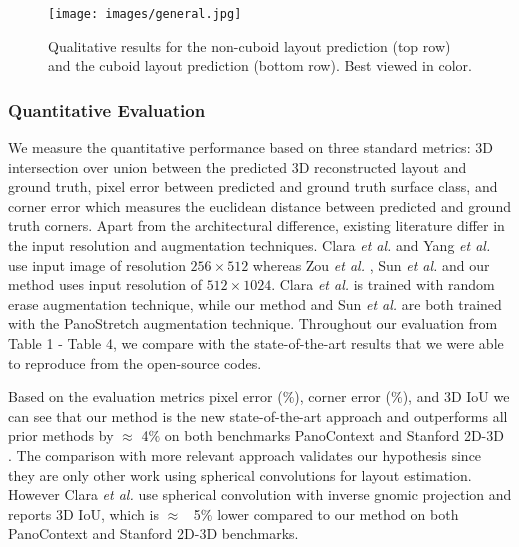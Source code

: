 \documentclass[final]{cvpr}
\begin{document}
\begin{figure*}[!t]
    \centering
    \texttt{[image: images/general.jpg]}
    \caption{Qualitative results for the non-cuboid layout prediction (top row) and the cuboid layout prediction (bottom row). Best viewed in color.}
    \label{fig:layout}
\end{figure*}


\subsubsection{Quantitative Evaluation}\label{subsec:quantitative}

We measure the quantitative performance based on three standard metrics: 3D intersection over union between the predicted 3D reconstructed layout and ground truth, pixel error between predicted and ground truth surface class, and corner error which measures the euclidean distance between predicted and ground truth corners. Apart from the architectural difference, existing literature differ in the input resolution and augmentation techniques. Clara \textit{et al.} \cite{fernandez2020corners} and Yang \textit{et al.} \cite{yang2019dula} use input image of resolution $ 256 \times 512 $ whereas Zou \textit{et al.} \cite{zou2018layoutnet}, Sun \textit{et al.} \cite{sun2019horizonnet} and our method uses input resolution of $ 512 \times 1024$. Clara \textit{et al.} \cite{fernandez2020corners} is trained with random erase augmentation technique, while our method and Sun \textit{et al.} \cite{sun2019horizonnet} are both trained with the PanoStretch augmentation technique. Throughout our evaluation from Table 1 - Table 4, we compare with the state-of-the-art results that we were able to reproduce from the open-source codes. 

Based on the evaluation metrics pixel error ($\%$), corner error ($\%$), and 3D IoU we can see that our method is the new state-of-the-art approach and  outperforms all prior methods by $\approx$ 4$\%$ on both benchmarks PanoContext \cite{zhang2014panocontext} and Stanford 2D-3D \cite{armeni2017joint}. The comparison with more relevant approach \cite{fernandez2020corners} validates our hypothesis since they are only other work using spherical convolutions for layout estimation. However Clara \textit{et al.} \cite{fernandez2020corners} use spherical convolution with inverse gnomic projection and reports 3D IoU, which is $\approx$ ~5$\%$ lower compared to our method on both PanoContext \cite{zhang2014panocontext} and Stanford 2D-3D \cite{armeni2017joint} benchmarks. 
\end{document}
